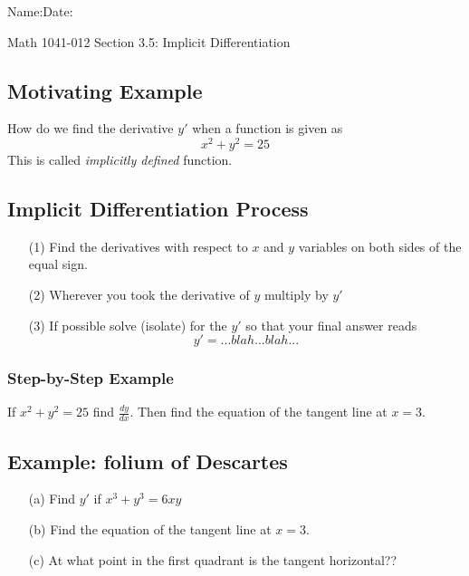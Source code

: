 \documentclass[12pt]{book}
\theoremstyle{definition}
\begin{document}
\begin{flushleft}
Name:\underline{\hspace{13cm}}Date:\underline{\hspace{2cm}}
\end{flushleft}
\begin{center}
{\Large Math 1041-012 \hspace{0.5cm} Section 3.5: Implicit Differentiation}
\end{center}
\subsection*{Motivating Example}
How do we find the derivative $y'$ when a function is given as
\[
x^2+y^2=25
\]
This is called \textit{implicitly defined} function.
\begin{tcolorbox}
\subsection*{Implicit Differentiation Process}
\begin{itemize}
    \item[(1)] Find the derivatives with respect to $x$ and $y$ variables on both sides of the equal sign.
    \item[(2)] Wherever you took the derivative of $y$ multiply by $y'$
    \item[(3)] If possible solve (isolate) for the $y'$ so that your final answer reads
    \[
    y'=...blah...blah...
    \]
\end{itemize}
\end{tcolorbox}
\subsubsection*{Step-by-Step Example}
If $x^2+y^2=25$ find $\frac{dy}{dx}$. Then find the equation of the tangent line at $x=3$.
\raggedbottom
\clearpage
\subsection*{Example: folium of Descartes}
\begin{itemize}
    \item[(a)] Find $y'$ if $x^3+y^3=6xy$
    \item[(b)] Find the equation of the tangent line at $x=3$.
    \item[(c)] At what point in the first quadrant is the tangent horizontal??
\end{itemize}
\vspace{7cm}
\end{document}
